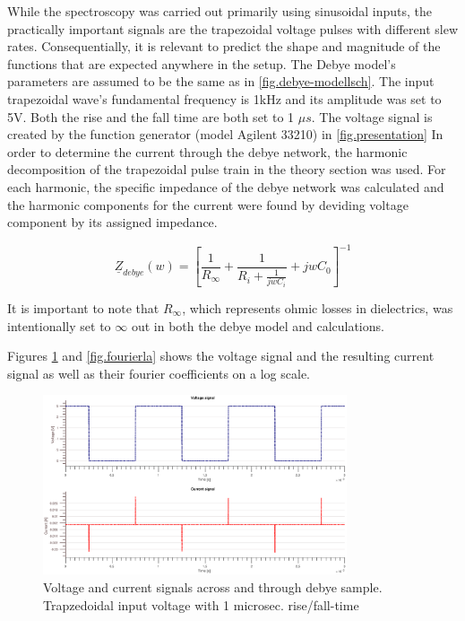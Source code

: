 While the spectroscopy was carried out primarily using sinusoidal inputs,
the practically important signals are the trapezoidal voltage pulses with different
slew rates. Consequentially, it is relevant to predict the shape and magnitude
of the functions that are expected anywhere in the setup. 
The Debye model's parameters are assumed to be the same as in \ref{fig.debye-modellsch}.
The input trapezoidal wave's fundamental frequency is 1kHz and its amplitude was
set to 5V. Both the rise and 
the fall time are both set to 1 $\mu s$. The voltage signal is created
by the function generator (model Agilent 33210) in \ref{fig.presentation}
\newline
In order to determine the current through the debye network, the harmonic decomposition of
the trapezoidal pulse train in the theory section was used. For each harmonic, the specific
impedance of the debye network was calculated and the harmonic components for the current were found by deviding voltage component by its assigned impedance.

\begin{equation}
 \underline{Z}_{debye}(w)=\left[\frac{1}{R_{\infty}}+\frac{1}{R_{i}+\frac{1}{jwC_{i}}}+jwC_{0}\right]^{-1}
 \label{debyeimpedance}
\end{equation}

It is important to note that $R_{\infty}$, which represents
ohmic losses in dielectrics, was intentionally set to $\infty$ out in both the debye model and calculations.

Figures \ref{fig.beforeandafter} and \ref{fig.fourierla} shows the voltage signal and the resulting current signal as well as their fourier coefficients on a log scale.

\begin{figure}[h!tb]
\centerline{\includegraphics[width=0.8\textwidth]{figures/Method/signal_simulation/beforeandafter.eps}}
\caption{Voltage and current signals across and through debye sample. Trapzedoidal input voltage with 1 microsec. rise/fall-time}
\label{fig.beforeandafter}
\end{figure}

